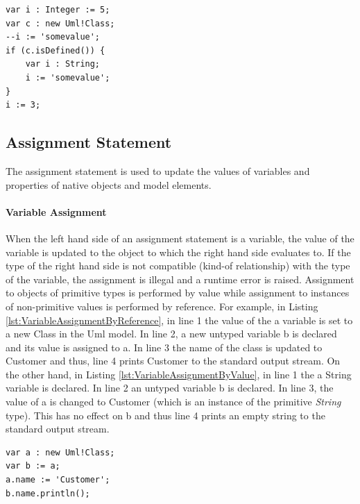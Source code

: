 \begin{lstlisting}[basicstyle=\ttfamily\footnotesize, flexiblecolumns=true, numbers=none, nolol=true, caption=Example illustrating declaration and use of variables, label=lst:Variables, numbers=left, language=EOL, tabsize=2]
var i : Integer := 5;
var c : new Uml!Class;
--i := 'somevalue';
if (c.isDefined()) {
	var i : String;
	i := 'somevalue';
}
i := 3;
\end{lstlisting}

\subsection{Assignment Statement}

The assignment statement is used to update the values of variables and  properties of native objects and model elements.

\paragraph{Variable Assignment}

When the left hand side of an assignment statement is a variable, the value of the variable is updated to the object to which the right hand side evaluates to. If the type of the right hand side is not compatible (kind-of relationship) with the type of the variable, the assignment is illegal and a runtime error is raised. Assignment to objects of primitive types is performed by value while assignment to instances of non-primitive values is performed by reference. For example, in Listing \ref{lst:VariableAssignmentByReference}, in line 1 the value
of the a variable is set to a new Class in the Uml model. In line 2, a new untyped variable b is declared and its value is assigned to a. In line 3 the name of the class is updated to Customer and thus, line 4 prints Customer to the standard output stream. On the other hand, in Listing \ref{lst:VariableAssignmentByValue}, in line 1 the a String variable is declared. In line 2 an untyped variable b is declared. In line 3, the value of a is changed to Customer (which is an instance of the primitive \emph{String} type). This has no effect on b and thus line 4 prints an empty string to the standard output stream.

\begin{lstlisting}[basicstyle=\ttfamily\footnotesize, flexiblecolumns=true, numbers=none, nolol=true, caption=Assigning the value of a variable by reference, label=lst:VariableAssignmentByReference, numbers=left, language=EOL, tabsize=2]
var a : new Uml!Class;
var b := a;
a.name := 'Customer';
b.name.println();
\end{lstlisting}

